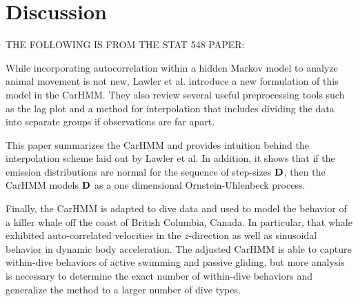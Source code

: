 
\section{Discussion}

THE FOLLOWING IS FROM THE STAT 548 PAPER:

While incorporating autocorrelation within a hidden Markov model to analyze animal movement is not new, Lawler et al. introduce a new formulation of this model in the CarHMM. They also review several useful preprocessing tools such as the lag plot and a method for interpolation that includes dividing the data into separate groups if observations are far apart. 

This paper summarizes the CarHMM and provides intuition behind the interpolation scheme laid out by Lawler et al. In addition, it shows that if the emission distributions are normal for the sequence of step-sizes $\mathbf{D}$, then the CarHMM models $\mathbf{D}$ as a one dimensional Ornstein-Uhlenbeck process.

Finally, the CarHMM is adapted to dive data and used to model the behavior of a killer whale off the coast of British Columbia, Canada. In particular, that whale exhibited auto-correlated velocities in the $z$-direction as well as sinusoidal behavior in dynamic body acceleration. The adjusted CarHMM is able to capture within-dive behaviors of active swimming and passive gliding, but more analysis is necessary to determine the exact number of within-dive behaviors and generalize the method to a larger number of dive types.